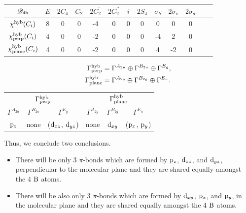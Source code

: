 \documentclass[a4paper]{book}
\newcommand{\orb}[1]{{\rm #1}}
\newcommand{\orbp}{\orb{p}}
\newcommand{\orbd}{\orb{d}}
\begin{document}
\begin{solution}
		\begin{center}
		\begin{tabular}{ccccccccccccc}\hline
	$\mathscr{D}_{\rm 4h}$ & $E$ & $2C_4$ &	$C_2$	& $2C^\prime_2$	&	$2C^{\prime\prime}_2$	&	$i$	&	$2S_4$	&	$\sigma_{h}$	&	$2\sigma_{v}$ &	$2\sigma_{d}$	&		&\\ \hline
	$\chi^{\rm hyb}(C_i)$ & 8 & 0 & 0 & -4 & 0 & 0 & 0 & 0 & 0 & 0 \\
	$\chi^{\rm hyb}_{\rm perp}(C_i)$ & 4 & 0 & 0 & -2 & 0 & 0 & 0 & -4 & 2 & 0 \\ 
	$\chi^{\rm hyb}_{\rm plane}(C_i)$ & 4 & 0 & 0 & -2 & 0 & 0 & 0 & 4 & -2 & 0 \\ \hline
		\end{tabular}
		\end{center}
		
		\begin{align*}
			\Gamma^{\rm hyb}_{\rm perp} &= \Gamma^{A_{2u}} \oplus \Gamma^{B_{2u}} \oplus \Gamma^{E_g}, \\
			\Gamma^{\rm hyb}_{\rm plane} &= \Gamma^{A_{2g}} \oplus \Gamma^{B_{2g}} \oplus \Gamma^{E_u}.
		\end{align*}
		
		\begin{center}
		\begin{tabular}{ccc|ccc} \hline
		\multicolumn{3}{c|}{$\Gamma^{\rm hyb}_{\rm perp}$} & \multicolumn{3}{c}{$\Gamma^{\rm hyb}_{\rm plane}$} \\
		$\Gamma^{A_{2u}}$	&	$\Gamma^{B_{2u}}$	&	$\Gamma^{E_g}$	&	$\Gamma^{A_{2g}}$	&	$\Gamma^{B_{2g}}$	&	$\Gamma^{E_u}$	\\	\hline
		$\orbp_z$	&	none & ($\orbd_{xz}$, $\orbd_{yz}$)	&	none & $\orbd_{xy}$	&	($\orbp_x$, $\orbp_y$) \\ \hline
		\end{tabular}
		\end{center}
		
		Thus, we conclude two conclusions.
		\begin{itemize}
			
		\item There will be only 3 $\pi$-bonds which are formed by $\orbp_z$, $\orbd_{xz}$, and $\orbd_{yz}$, perpendicular to the molecular plane and they are shared equally amongst the 4 $\ce{B}$ atoms.
		
		\item There will be also only 3 $\pi$-bonds which are formed by $\orbd_{xy}$, $\orbp_x$, and $\orbp_y$, in the molecular plane and they are shared equally amongst the 4 $\ce{B}$ atoms.
		
		\end{itemize}
		
	\end{solution}
	
\end{document}
